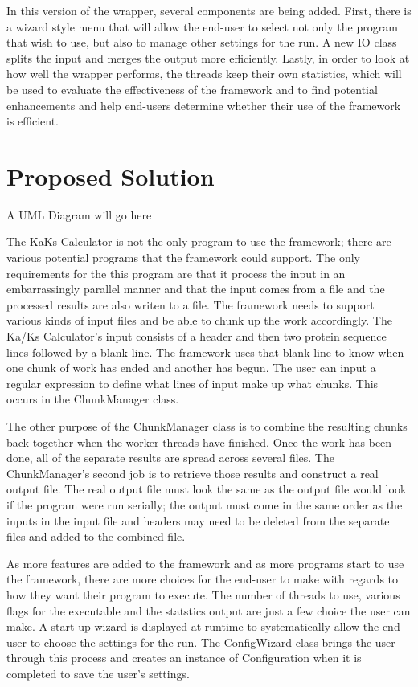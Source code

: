 \documentclass[12pt]{article}
\begin{document}

In this version of the wrapper, several components are being added. First, there
is a wizard style menu that will allow the end-user to select not only the 
program that wish to use, but also to manage other settings for the run. A new 
IO class splits the input and merges the output more efficiently. Lastly, in 
order to look at how well the wrapper performs, the threads keep their own 
statistics, which will be used to evaluate the effectiveness of the framework 
and to find potential enhancements and help end-users determine whether their 
use of the framework is efficient.

\section{Proposed Solution}

A UML Diagram will go here

The KaKs Calculator is not the only program to use the framework; there are
various potential programs that the framework could support. The only 
requirements for the this program are that it process the input in an 
embarrassingly parallel manner and that the input comes from a file and the 
processed results are also writen to a file. The framework needs to support 
various kinds of input files and be able to chunk up the work accordingly. The 
Ka/Ks Calculator's input consists of a header and then two protein sequence 
lines followed by a blank line. The framework uses that blank line to know when 
one chunk of work has ended and another has begun. The user can input a regular 
expression to define what lines of input make up what chunks. This occurs in 
the ChunkManager class. 

The other purpose of the ChunkManager class is to combine the resulting chunks 
back together when the worker threads have finished. Once the work has been
done, all of the separate results are spread across several files. The
ChunkManager's second job is to retrieve those results and construct a real
output file. The real output file must look the same as the output file would
look if the program were run serially; the output must come in the same order as
the inputs in the input file and headers may need to be deleted from the
separate files and added to the combined file.

As more features are added to the framework and as more programs start to use 
the framework, there are more choices for the end-user to make with regards to 
how they want their program to execute. The number of threads to use, various 
flags for the executable and the statstics output are just a few choice the 
user can make. A start-up wizard is displayed at runtime to systematically allow
the end-user to choose the settings for the run. The ConfigWizard class brings 
the user through this process and creates an instance of Configuration when it 
is completed to save the user's settings.
\end{document}

